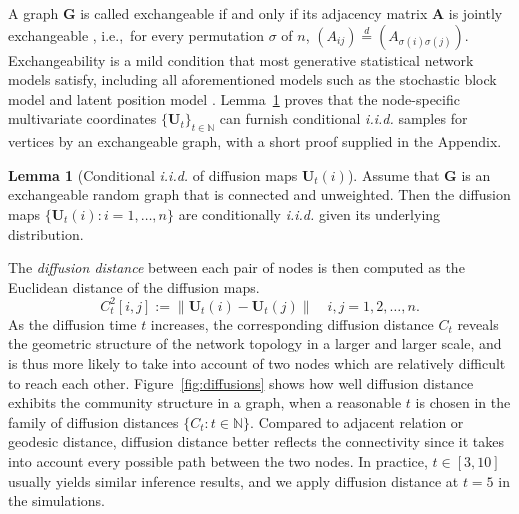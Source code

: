 \documentclass[11pt]{article}
\theoremstyle{definition}
\newtheorem{lemma}[theorem]{Lemma}
\begin{document}
A graph $\mathbf{G}$ is called exchangeable if and only if its adjacency matrix $\mathbf{A}$ is jointly exchangeable \cite{orbanz2015bayesian}, i.e.,~for every permutation $\sigma$ of $n$, $(A_{ij}) \stackrel{d}{=} (A_{\sigma(i) \sigma(j)})$. Exchangeability is a mild condition that most generative statistical network models satisfy, including all aforementioned models such as the stochastic block model and latent position model \cite{rohe2011spectral, sussman2014consistent, todeschini2016exchangeable}. Lemma~\ref{main_lemma} proves that the node-specific multivariate coordinates $\{ \mathbf{U}_{t} \}_{t \in \mathbb{N}}$ can furnish conditional \textit{i.i.d.} samples for vertices by an exchangeable graph, with a short proof supplied in the Appendix.
\begin{lemma}[Conditional \textit{i.i.d.} of diffusion maps $\mathbf{U}_{t}(i)$]
	\label{main_lemma}
	Assume that $\mathbf{G}$ is an exchangeable random graph that is connected and unweighted. Then the diffusion maps $\{ \mathbf{U}_{t}(i) : i = 1, \ldots, n \}$ are conditionally \textit{i.i.d.} given its underlying distribution.   
\end{lemma}

The \textit{diffusion distance} between each pair of nodes is then computed as the Euclidean distance of the diffusion maps. 
\begin{equation}
\label{eq:diffusion}
C^2_{t}[i,j]  :=   \parallel \mathbf{U}_{t}(i) - \mathbf{U}_{t}(j) \parallel   \quad i,j = 1,2, \ldots , n.
\end{equation}
As the diffusion time $t$ increases, the corresponding diffusion distance $C_{t}$ reveals the geometric structure of the network topology in a larger and larger scale, and is thus more likely to take into account of two nodes which are relatively difficult to reach each other. Figure~\ref{fig:diffusions} shows how well diffusion distance exhibits the community structure in a graph, when a reasonable $t$ is chosen in the family of diffusion distances $\{ C_{t} : t \in \mathbb{N} \}$. Compared to adjacent relation or geodesic distance, diffusion distance better reflects the connectivity since it takes into account every possible path between the two nodes. In practice, $t \in [3,10]$ usually yields similar inference results, and we apply diffusion distance at $t=5$ in the simulations. 
\end{document}
